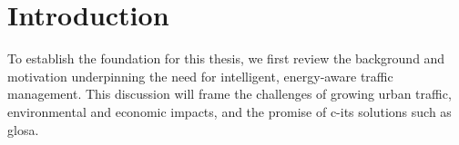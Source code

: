 \chapter{Introduction}
\label{ch:Introduction}
To establish the foundation for this thesis, we first review the background and motivation underpinning the need for intelligent, energy‐aware traffic management. This discussion will frame the challenges of growing urban traffic, environmental and economic impacts, and the promise of \ac{c-its} solutions such as \ac{glosa}.







